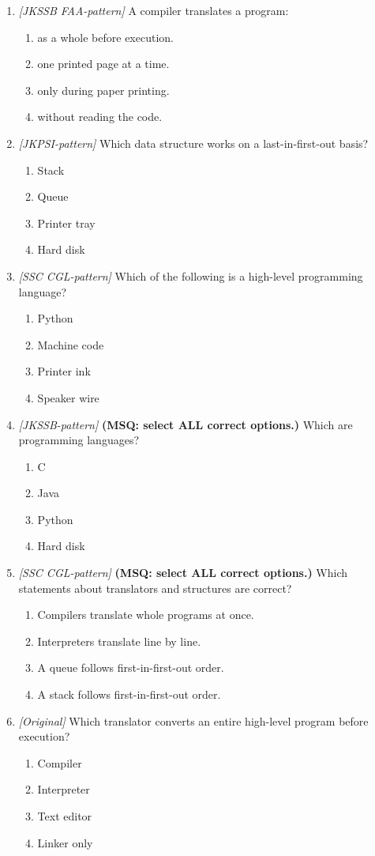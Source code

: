 \begin{enumerate}[label=\textbf{Q\arabic*.}, leftmargin=*]
\item \textit{[JKSSB FAA-pattern]} A compiler translates a program:
  \begin{enumerate}[label=\Alph*.]
    \item as a whole before execution.
    \item one printed page at a time.
    \item only during paper printing.
    \item without reading the code.
  \end{enumerate}
\item \textit{[JKPSI-pattern]} Which data structure works on a last-in-first-out basis?
  \begin{enumerate}[label=\Alph*.]
    \item Stack
    \item Queue
    \item Printer tray
    \item Hard disk
  \end{enumerate}
\item \textit{[SSC CGL-pattern]} Which of the following is a high-level programming language?
  \begin{enumerate}[label=\Alph*.]
    \item Python
    \item Machine code
    \item Printer ink
    \item Speaker wire
  \end{enumerate}
\item \textit{[JKSSB-pattern]} \textbf{(MSQ: select ALL correct options.)} Which are programming languages?
  \begin{enumerate}[label=\Alph*.]
    \item C
    \item Java
    \item Python
    \item Hard disk
  \end{enumerate}
\item \textit{[SSC CGL-pattern]} \textbf{(MSQ: select ALL correct options.)} Which statements about translators and structures are correct?
  \begin{enumerate}[label=\Alph*.]
    \item Compilers translate whole programs at once.
    \item Interpreters translate line by line.
    \item A queue follows first-in-first-out order.
    \item A stack follows first-in-first-out order.
  \end{enumerate}
\item \textit{[Original]} Which translator converts an entire high-level program before execution?
  \begin{enumerate}[label=\Alph*.]
\item Compiler
   \item Interpreter
   \item Text editor
   \item Linker only
  \end{enumerate}


\end{enumerate}
